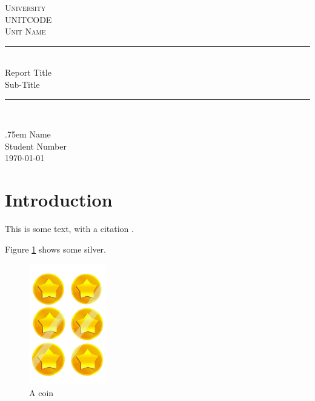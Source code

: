 \documentclass[a4paper,11pt]{article}
\begin{document}
\begin{titlepage}

    \centering

    \normalfont\normalsize
	\textsc{University}\\ %
  \textsc{UNITCODE}\\
  \textsc{Unit Name} \\
	\vspace{25pt} %
	\rule{\linewidth}{0.5pt}\\ %
	\vspace{20pt} %
    {\huge Report Title }\\
    \vspace{0.5em}
    {\large Sub-Title}
	\vspace{12pt} %
	\rule{\linewidth}{2pt}\\ %
    
	\vspace{0.1\textheight} %
 

    \normalsize \lineskip .75em
    \vspace{1em}
    \LARGE Name \\ \small Student Number  \\
 

    \vspace{0.1\textheight}
    \today

\end{titlepage}


\tableofcontents
\pagebreak
\listoffigures
\listoftables
\listoflistings


\pagebreak

\section{Introduction}
This is some text, with a citation \cite{sampleRef}. 

Figure \ref{fig:coin} shows some silver. 

\begin{figure}[h!]
    \center
    \includegraphics[width=0.3\textwidth]{resources/coin.png}
    \caption{A coin}
    \label{fig:coin}
\end{figure}
\end{document}
